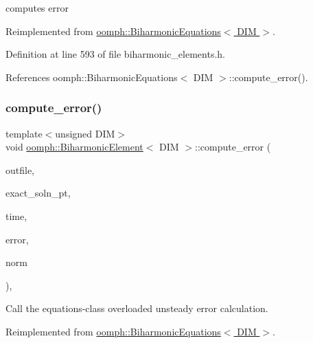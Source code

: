 computes error 



Reimplemented from \hyperlink{classoomph_1_1BiharmonicEquations_a914c46acc12aeea7d4b6288eceef1b5b}{oomph\+::\+Biharmonic\+Equations$<$ D\+I\+M $>$}.



Definition at line 593 of file biharmonic\+\_\+elements.\+h.



References oomph\+::\+Biharmonic\+Equations$<$ D\+I\+M $>$\+::compute\+\_\+error().

\mbox{\label{classoomph_1_1BiharmonicElement_a0b1d07f8300afffeacaabb3aef2841fb}} 
\subsubsection{\texorpdfstring{compute\+\_\+error()}{compute\_error()}\hspace{0.1cm}{\footnotesize\ttfamily [2/2]}}
{\footnotesize\ttfamily template$<$unsigned D\+IM$>$ \\
void \hyperlink{classoomph_1_1BiharmonicElement}{oomph\+::\+Biharmonic\+Element}$<$ D\+IM $>$\+::compute\+\_\+error (\begin{DoxyParamCaption}\item[{std\+::ostream \&}]{outfile,  }\item[{\hyperlink{classoomph_1_1FiniteElement_ad4ecf2b61b158a4b4d351a60d23c633e}{Finite\+Element\+::\+Unsteady\+Exact\+Solution\+Fct\+Pt}}]{exact\+\_\+soln\+\_\+pt,  }\item[{const double \&}]{time,  }\item[{double \&}]{error,  }\item[{double \&}]{norm }\end{DoxyParamCaption})\hspace{0.3cm}{\ttfamily [inline]}, {\ttfamily [virtual]}}



Call the equations-\/class overloaded unsteady error calculation. 



Reimplemented from \hyperlink{classoomph_1_1BiharmonicEquations_a33e635f29e497c978a68bf5094391038}{oomph\+::\+Biharmonic\+Equations$<$ D\+I\+M $>$}.



